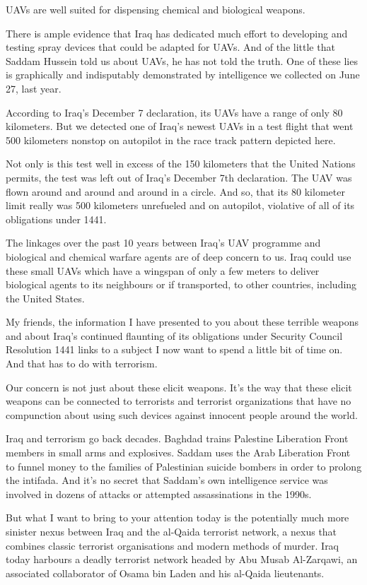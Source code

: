 \documentclass[10pt,a4paper]{article}
\begin{document}
UAVs are well suited for dispensing chemical and biological weapons.

There is ample evidence that Iraq has dedicated much effort to developing and testing spray devices that could be adapted for UAVs. And of the little that Saddam Hussein told us about UAVs, he has not told the truth. One of these lies is graphically and indisputably demonstrated by intelligence we collected on June 27, last year.

According to Iraq's December 7 declaration, its UAVs have a range of only 80 kilometers. But we detected one of Iraq's newest UAVs in a test flight that went 500 kilometers nonstop on autopilot in the race track pattern depicted here.

Not only is this test well in excess of the 150 kilometers that the United Nations permits, the test was left out of Iraq's December 7th declaration. The UAV was flown around and around and around in a circle. And so, that its 80 kilometer limit really was 500 kilometers unrefueled and on autopilot, violative of all of its obligations under 1441.

The linkages over the past 10 years between Iraq's UAV programme and biological and chemical warfare agents are of deep concern to us. Iraq could use these small UAVs which have a wingspan of only a few meters to deliver biological agents to its neighbours or if transported, to other countries, including the United States.

My friends, the information I have presented to you about these terrible weapons and about Iraq's continued flaunting of its obligations under Security Council Resolution 1441 links to a subject I now want to spend a little bit of time on. And that has to do with terrorism.

Our concern is not just about these elicit weapons. It's the way that these elicit weapons can be connected to terrorists and terrorist organizations that have no compunction about using such devices against innocent people around the world.

Iraq and terrorism go back decades. Baghdad trains Palestine Liberation Front members in small arms and explosives. Saddam uses the Arab Liberation Front to funnel money to the families of Palestinian suicide bombers in order to prolong the intifada. And it's no secret that Saddam's own intelligence service was involved in dozens of attacks or attempted assassinations in the 1990s.

But what I want to bring to your attention today is the potentially much more sinister nexus between Iraq and the al-Qaida terrorist network, a nexus that combines classic terrorist organisations and modern methods of murder. Iraq today harbours a deadly terrorist network headed by Abu Musab Al-Zarqawi, an associated collaborator of Osama bin Laden and his al-Qaida lieutenants.
\end{document}
